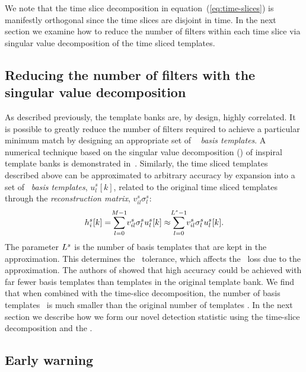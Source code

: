We note that the time slice decomposition in equation~(\ref{eq:time-slices}) is
manifestly orthogonal since the time slices are disjoint in time.  In the next
section we examine how to reduce the number of filters within each time slice
via singular value decomposition of the time sliced templates.

\subsection{Reducing the number of filters with the singular value
decomposition}

As described previously, the template banks are, by design, highly correlated.
It is possible to greatly reduce the number of filters required to achieve a
particular minimum match by designing an appropriate set of \SVD\ {\em
basis templates}.  A numerical technique based on the singular value
decomposition (\SVD) of inspiral template banks is demonstrated
in~\cite{Cannon:2010p10398}.  Similarly, the time sliced templates described
above can be approximated to arbitrary accuracy by expansion into a set of
\SVD\ \emph{basis templates}, $u_l^s[k]$, related to the original time
sliced templates through the \emph{reconstruction matrix},
$v_{il}^s\sigma_l^s$:
%
\begin{equation}
h_i^s[k] = \sum_{\mathclap{l=0}}^{\mathclap{M-1}} v_{il}^s \sigma_l^s u_l^s[k] \approx \sum_{\mathclap{l=0}}^{\mathclap{L^s-1}} v_{il}^s \sigma_l^s u_l^s[k].
\label{eq:svddecomp}
\end{equation}
%
%
%
The parameter $L^s$ is the number of basis templates that are kept in
the approximation.  This determines the \SVD\ tolerance, which affects the
\SNR\ loss due to the approximation.  The authors of \cite{Cannon:2010p10398}
showed that high accuracy could be achieved with far fewer basis templates than
templates in the original template bank.  We find that when combined with the
time-slice decomposition, the number of basis templates \numsvdtmps\ is much
smaller than the original number of templates \numtmps.  In the next section we
describe how we form our novel detection statistic using the time-slice
decomposition and the \SVD.

\subsection{Early warning \SNR }

